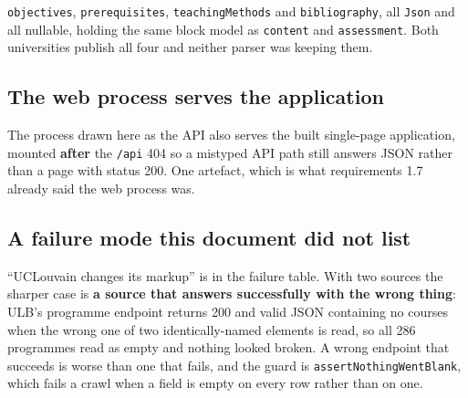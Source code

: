 \documentclass[11pt,a4paper]{article}
\begin{document}
\texttt{objectives}, \texttt{prerequisites}, \texttt{teachingMethods} and
\texttt{bibliography}, all \texttt{Json} and all nullable, holding the same
block model as \texttt{content} and \texttt{assessment}. Both universities
publish all four and neither parser was keeping them.

\subsection{The web process serves the application}

The process drawn here as the API also serves the built single-page
application, mounted \textbf{after} the \texttt{/api} 404 so a mistyped API
path still answers JSON rather than a page with status 200. One artefact, which
is what requirements 1.7 already said the web process was.

\subsection{A failure mode this document did not list}

``UCLouvain changes its markup'' is in the failure table. With two sources the
sharper case is \textbf{a source that answers successfully with the wrong
thing}: ULB's programme endpoint returns 200 and valid JSON containing no
courses when the wrong one of two identically-named elements is read, so all 286
programmes read as empty and nothing looked broken. A wrong endpoint that
succeeds is worse than one that fails, and the guard is
\texttt{assertNothingWentBlank}, which fails a crawl when a field is empty on
every row rather than on one.
\end{document}
